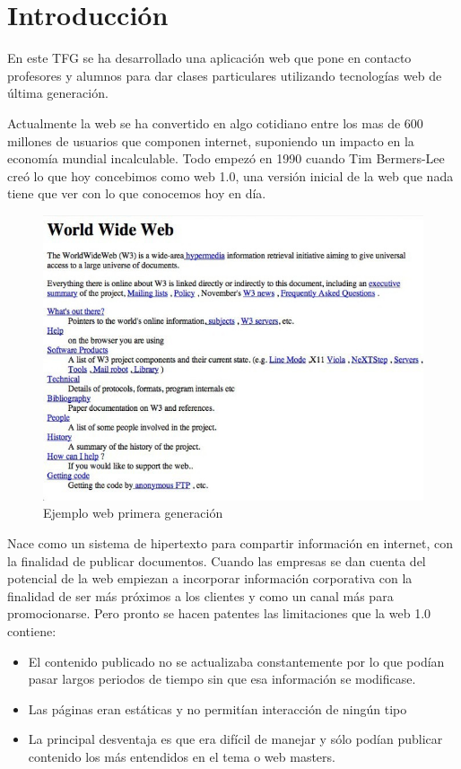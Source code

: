\chapter{Introducción}
En este TFG se ha desarrollado una aplicación web que pone en contacto profesores y alumnos para dar clases particulares utilizando tecnologías web de última generación.

Actualmente la web se ha convertido en algo cotidiano entre los mas de 600 millones de usuarios que componen internet, suponiendo un impacto en la economía mundial incalculable. Todo empezó en 1990 cuando Tim Bermers-Lee creó lo que hoy concebimos como web 1.0, una versión inicial de la web que nada tiene que ver con lo que conocemos hoy en día.
\begin{figure}[!h]
    \centering
    \includegraphics[width=140mm]{img/introduccion/web1.jpg}
    \caption[Ejemplo web 1º generación]{Ejemplo web primera generación}
\end{figure}

Nace como un sistema de hipertexto para compartir información en internet, con la finalidad de publicar documentos. Cuando las empresas se dan cuenta del potencial de la web empiezan a incorporar información corporativa con la finalidad de ser más próximos a los clientes y como un canal más para promocionarse. Pero pronto se hacen patentes las limitaciones que la web 1.0 contiene:

\begin{itemize}

    \item El contenido publicado no se actualizaba constantemente por lo que podían pasar largos periodos de tiempo sin que esa información se modificase.

    \item Las páginas eran estáticas y no permitían interacción de ningún tipo

    \item La principal desventaja es que era difícil de manejar y sólo podían publicar contenido los más entendidos en el tema o web masters.

\end{itemize}

